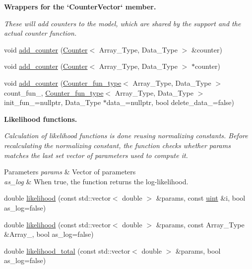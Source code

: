 \begin{Indent}\textbf{ Wrappers for the `\+Counter\+Vector` member.}\par
{\em These will add counters to the model, which are shared by the support and the actual counter function. }\begin{DoxyCompactItemize}
\item 
void \hyperlink{classbarry_1_1_model_a1ed91acc6c747eabc8a83726c0ec7de5}{add\+\_\+counter} (\hyperlink{classbarry_1_1_counter}{Counter}$<$ Array\+\_\+\+Type, Data\+\_\+\+Type $>$ \&counter)
\item 
void \hyperlink{classbarry_1_1_model_a05265a5a9a12109a4a2b56b3bb42015e}{add\+\_\+counter} (\hyperlink{classbarry_1_1_counter}{Counter}$<$ Array\+\_\+\+Type, Data\+\_\+\+Type $>$ $\ast$counter)
\item 
void \hyperlink{classbarry_1_1_model_a950b0429e07047d4774eac60f7c335f2}{add\+\_\+counter} (\hyperlink{namespacebarry_abaaae3200da8e4b7faac3c04fe9c3081}{Counter\+\_\+fun\+\_\+type}$<$ Array\+\_\+\+Type, Data\+\_\+\+Type $>$ count\+\_\+fun\+\_\+, \hyperlink{namespacebarry_abaaae3200da8e4b7faac3c04fe9c3081}{Counter\+\_\+fun\+\_\+type}$<$ Array\+\_\+\+Type, Data\+\_\+\+Type $>$ init\+\_\+fun\+\_\+=nullptr, Data\+\_\+\+Type $\ast$data\+\_\+=nullptr, bool delete\+\_\+data\+\_\+=false)
\end{DoxyCompactItemize}
\end{Indent}
\begin{Indent}\textbf{ Likelihood functions.}\par
{\em Calculation of likelihood functions is done reusing normalizing constants. Before recalculating the normalizing constant, the function checks whether {\ttfamily params} matches the last set vector of parameters used to compute it.


\begin{DoxyParams}{Parameters}
{\em params} & Vector of parameters \\
\hline
{\em as\+\_\+log} & When {\ttfamily true}, the function returns the log-\/likelihood. \\
\hline
\end{DoxyParams}
}\begin{DoxyCompactItemize}
\item 
double \hyperlink{classbarry_1_1_model_abc2f255c6b6c4dd0ff3680aab35fd308}{likelihood} (const std\+::vector$<$ double $>$ \&params, const \hyperlink{namespacebarry_a11dfc53ddb4672278319aa04f1e09a6c}{uint} \&i, bool as\+\_\+log=false)
\item 
double \hyperlink{classbarry_1_1_model_adf2c30d9c5ffdc87af6813d110146968}{likelihood} (const std\+::vector$<$ double $>$ \&params, const Array\+\_\+\+Type \&Array\+\_\+, bool as\+\_\+log=false)
\item 
double \hyperlink{classbarry_1_1_model_a2fe9cf412c5b2323c35c18952f9cb09d}{likelihood\+\_\+total} (const std\+::vector$<$ double $>$ \&params, bool as\+\_\+log=false)
\end{DoxyCompactItemize}
\end{Indent}
